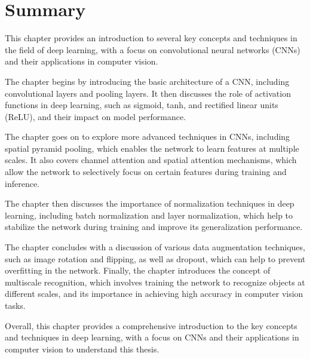 

\section{Summary}
This chapter provides an introduction to several key concepts and techniques in the field of deep learning, with a focus on convolutional neural networks (CNNs) and their applications in computer vision.

The chapter begins by introducing the basic architecture of a CNN, including convolutional layers and pooling layers. It then discusses the role of activation functions in deep learning, such as sigmoid, tanh, and rectified linear units (ReLU), and their impact on model performance.

The chapter goes on to explore more advanced techniques in CNNs, including spatial pyramid pooling, which enables the network to learn features at multiple scales. It also covers channel attention and spatial attention mechanisms, which allow the network to selectively focus on certain features during training and inference.

The chapter then discusses the importance of normalization techniques in deep learning, including batch normalization and layer normalization, which help to stabilize the network during training and improve its generalization performance.

The chapter concludes with a discussion of various data augmentation techniques, such as image rotation and flipping, as well as dropout, which can help to prevent overfitting in the network. Finally, the chapter introduces the concept of multiscale recognition, which involves training the network to recognize objects at different scales, and its importance in achieving high accuracy in computer vision tasks.

Overall, this chapter provides a comprehensive introduction to the key concepts and techniques in deep learning, with a focus on CNNs and their applications in computer vision to understand this thesis.